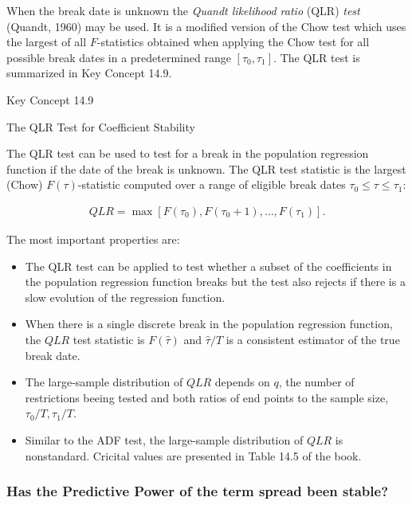 \documentclass[]{book}
\theoremstyle{definition}
\theoremstyle{definition}
\theoremstyle{definition}
\theoremstyle{remark}
\begin{document}
When the break date is unknown the \emph{Quandt likelihood ratio} (QLR)
\emph{test} (Quandt, 1960) may be used. It is a modified version of the
Chow test which uses the largest of all \(F\)-statistics obtained when
applying the Chow test for all possible break dates in a predetermined
range \(\left[\tau_0,\tau_1\right]\). The QLR test is summarized in Key
Concept 14.9.

Key Concept 14.9

The QLR Test for Coefficient Stability

The QLR test can be used to test for a break in the population
regression function if the date of the break is unknown. The QLR test
statistic is the largest (Chow) \(F(\tau)\)-statistic computed over a
range of eligible break dates \(\tau_0 \leq \tau \leq \tau_1\):

\begin{align}
  QLR = \max\left[F(\tau_0),F(\tau_0 +1),\dots,F(\tau_1)\right]. \label{eq:QLRstatistic}
\end{align}

The most important properties are:

\begin{itemize}
\item
  The QLR test can be applied to test whether a subset of the
  coefficients in the population regression function breaks but the test
  also rejects if there is a slow evolution of the regression function.
\item
  When there is a single discrete break in the population regression
  function, the \(QLR\) test statistic is \(F(\widehat{\tau})\) and
  \(\widehat{\tau}/T\) is a consistent estimator of the true break date.
\item
  The large-sample distribution of \(QLR\) depends on \(q\), the number
  of restrictions beeing tested and both ratios of end points to the
  sample size, \(\tau_0/T, \tau_1/T\).
\item
  Similar to the ADF test, the large-sample distribution of \(QLR\) is
  nonstandard. Cricital values are presented in Table 14.5 of the book.
\end{itemize}

\subsubsection*{Has the Predictive Power of the term spread been
stable?}\label{has-the-predictive-power-of-the-term-spread-been-stable}
\end{document}

